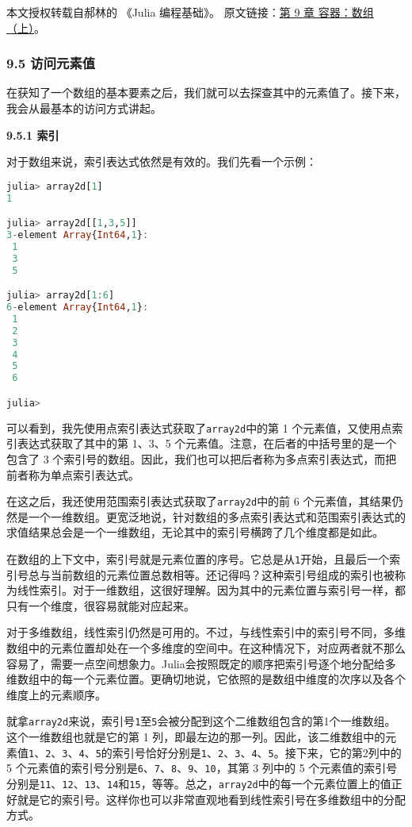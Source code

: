 
本文授权转载自郝林的 《Julia 编程基础》。 原文链接：\href{https://github.com/hyper0x/JuliaBasics/blob/master/book/ch09.md}{第 9 章 容器：数组（上）}。


\subsubsection{9.5 访问元素值}

在获知了一个数组的基本要素之后，我们就可以去探查其中的元素值了。接下来，我会从最基本的访问方式讲起。

\textbf{9.5.1 索引}

对于数组来说，索引表达式依然是有效的。我们先看一个示例：

\begin{lstlisting}[language=julia]
julia> array2d[1]
1

julia> array2d[[1,3,5]]
3-element Array{Int64,1}:
 1
 3
 5

julia> array2d[1:6]
6-element Array{Int64,1}:
 1
 2
 3
 4
 5
 6

julia> 
\end{lstlisting}

可以看到，我先使用点索引表达式获取了\verb`array2d`中的第 1 个元素值，又使用点索引表达式获取了其中的第 1、3、5 个元素值。注意，在后者的中括号里的是一个包含了 3 个索引号的数组。因此，我们也可以把后者称为多点索引表达式，而把前者称为单点索引表达式。

在这之后，我还使用范围索引表达式获取了\verb`array2d`中的前 6 个元素值，其结果仍然是一个一维数组。更宽泛地说，针对数组的多点索引表达式和范围索引表达式的求值结果总会是一个一维数组，无论其中的索引号横跨了几个维度都是如此。

在数组的上下文中，索引号就是元素位置的序号。它总是从\verb`1`开始，且最后一个索引号总与当前数组的元素位置总数相等。还记得吗？这种索引号组成的索引也被称为线性索引。对于一维数组，这很好理解。因为其中的元素位置与索引号一样，都只有一个维度，很容易就能对应起来。

对于多维数组，线性索引仍然是可用的。不过，与线性索引中的索引号不同，多维数组中的元素位置却处在一个多维度的空间中。在这种情况下，对应两者就不那么容易了，需要一点空间想象力。Julia会按照既定的顺序把索引号逐个地分配给多维数组中的每一个元素位置。更确切地说，它依照的是数组中维度的次序以及各个维度上的元素顺序。

就拿\verb`array2d`来说，索引号\verb`1`至\verb`5`会被分配到这个二维数组包含的第1个一维数组。这个一维数组也就是它的第 1 列，即最左边的那一列。因此，该二维数组中的元素值\verb`1`、\verb`2`、\verb`3`、\verb`4`、\verb`5`的索引号恰好分别是\verb`1`、\verb`2`、\verb`3`、\verb`4`、\verb`5`。接下来，它的第2列中的 5 个元素值的索引号分别是\verb`6`、\verb`7`、\verb`8`、\verb`9`、\verb`10`，其第 3 列中的 5 个元素值的索引号分别是\verb`11`、\verb`12`、\verb`13`、\verb`14`和\verb`15`，等等。总之，\verb`array2d`中的每一个元素位置上的值正好就是它的索引号。这样你也可以非常直观地看到线性索引号在多维数组中的分配方式。

